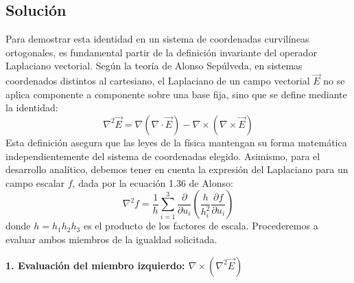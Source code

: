 \documentclass[a4paper]{article}
\begin{document}
\subsection*{Solución}

Para demostrar esta identidad en un sistema de coordenadas curvilíneas ortogonales, es fundamental partir de la definición invariante del operador Laplaciano vectorial. Según la teoría de Alonso Sepúlveda, en sistemas coordenados distintos al cartesiano, el Laplaciano de un campo vectorial $\vec{E}$ no se aplica componente a componente sobre una base fija, sino que se define mediante la identidad:
\begin{equation}
\nabla^2 \vec{E} = \nabla(\nabla \cdot \vec{E}) - \nabla \times (\nabla \times \vec{E})
\end{equation}
Esta definición asegura que las leyes de la física mantengan su forma matemática independientemente del sistema de coordenadas elegido. Asimismo, para el desarrollo analítico, debemos tener en cuenta la expresión del Laplaciano para un campo escalar $f$, dada por la ecuación 1.36 de Alonso:
\begin{equation}
\nabla^2 f = \frac{1}{h} \sum_{i=1}^3 \frac{\partial}{\partial u_i} \left( \frac{h}{h_i^2} \frac{\partial f}{\partial u_i} \right)
\end{equation}
donde $h = h_1 h_2 h_3$ es el producto de los factores de escala. Procederemos a evaluar ambos miembros de la igualdad solicitada.

\textbf{1. Evaluación del miembro izquierdo: $\nabla \times (\nabla^2 \vec{E})$}
\end{document}
